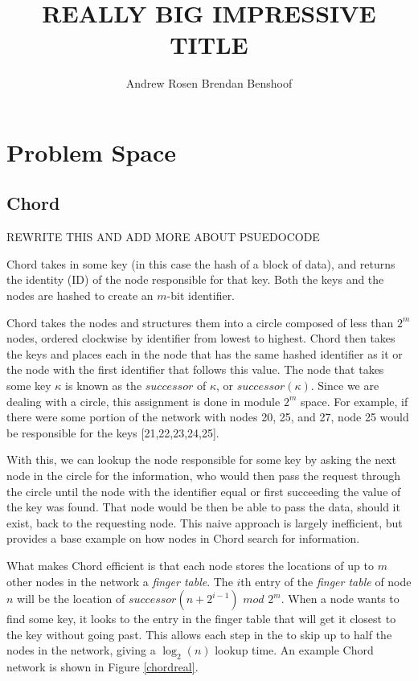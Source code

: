 \documentclass[12pt]{article} %
\title{REALLY BIG IMPRESSIVE TITLE}
\author{Andrew Rosen \qquad Brendan Benshoof }
\date{} %
\begin{document}
\maketitle

\section{Problem Space}



\subsection{Chord}

REWRITE THIS AND ADD MORE ABOUT PSUEDOCODE 

Chord \cite{Chord} takes in some key (in this case the hash of a block of data), and returns the identity (ID) of the node responsible for that key.  Both the keys and the nodes are hashed to create an $m$-bit identifier.

Chord takes the nodes and structures them into a circle composed of less than $2^m$ nodes, ordered clockwise by identifier from lowest to highest.  Chord then takes the keys and places each in the node that has the same hashed identifier as it or the node with the first identifier that follows this value.  The node that takes some key $\kappa$ is known as the $successor$ of $\kappa$, or $successor(\kappa)$.  Since we are dealing with a circle, this assignment is done in module $2^m$ space.  For example, if there were some portion of the network with nodes 20, 25, and 27, node 25 would be responsible for the keys [21,22,23,24,25].


With this, we can lookup the node responsible for some key by asking the next node in the circle for the information, who would then pass the request through the circle until the node with the identifier equal or first succeeding the value of the key was found.  That node would be then be able to pass the data, should it exist, back to the requesting node.  This naive approach is largely inefficient, but provides a base example on how nodes in Chord search for information.

What makes Chord efficient is that each node stores the locations of up to $m$ other nodes in the network a \emph{finger table}.  The $i$th entry of the \emph{finger table} of  node $n$ will be the location of $successor(n+2^{i-1})$ $mod$ $2^m$. When a node wants to find some key, it looks to the entry in the finger table that will get it closest to the key without going past.  This allows each step in the to skip up to half the nodes in the network, giving a $\log_2(n)$ lookup time. An example Chord network is shown in Figure \ref{chordreal}.
\end{document}
